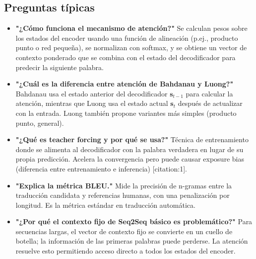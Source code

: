 \documentclass[12pt,a4paper,openany,oneside]{book}
\begin{document}
\subsection{Preguntas típicas}
\begin{itemize}
    \item \textbf{"¿Cómo funciona el mecanismo de atención?"}
    Se calculan pesos sobre los estados del encoder usando una función de alineación (p.ej., producto punto o red pequeña), se normalizan con softmax, y se obtiene un vector de contexto ponderado que se combina con el estado del decodificador para predecir la siguiente palabra.
    
    \item \textbf{"¿Cuál es la diferencia entre atención de Bahdanau y Luong?"}
    Bahdanau usa el estado anterior del decodificador \(\mathbf{s}_{t-1}\) para calcular la atención, mientras que Luong usa el estado actual \(\mathbf{s}_t\) después de actualizar con la entrada. Luong también propone variantes más simples (producto punto, general).
    
    \item \textbf{"¿Qué es teacher forcing y por qué se usa?"}
    Técnica de entrenamiento donde se alimenta al decodificador con la palabra verdadera en lugar de su propia predicción. Acelera la convergencia pero puede causar exposure bias (diferencia entre entrenamiento e inferencia) [citation:1].
    
    \item \textbf{"Explica la métrica BLEU."}
    Mide la precisión de n-gramas entre la traducción candidata y referencias humanas, con una penalización por longitud. Es la métrica estándar en traducción automática.
    
    \item \textbf{"¿Por qué el contexto fijo de Seq2Seq básico es problemático?"}
    Para secuencias largas, el vector de contexto fijo se convierte en un cuello de botella; la información de las primeras palabras puede perderse. La atención resuelve esto permitiendo acceso directo a todos los estados del encoder.
\end{itemize}
\end{document}
